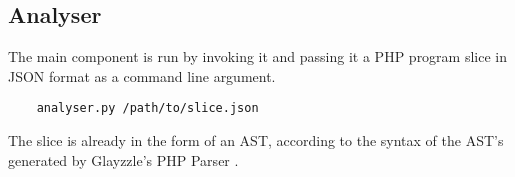 \subsection*{Analyser}
\label{sec:expr.analyser}

The main component is run by invoking it and passing it a PHP program slice in
JSON format as a command line argument.

\begin{verbatim}
    analyser.py /path/to/slice.json
\end{verbatim}

The slice is already in the form of an AST, according to the syntax of the AST's
generated by Glayzzle's PHP Parser \cite{glayzzle-php}.
